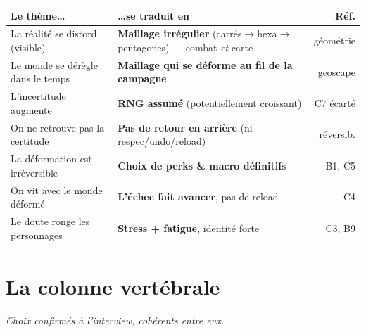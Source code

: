 \documentclass[11pt,a4paper]{article}
\begin{document}
\smallskip
\renewcommand{\arraystretch}{1.25}
\begin{tabularx}{\linewidth}{@{}X X r@{}}
\toprule
\textbf{Le thème\dots} & \textbf{\dots se traduit en} & \textbf{Réf.} \\
\midrule
La réalité se distord (visible) & \textbf{Maillage irrégulier} (carrés$\to$hexa$\to$pentagones) --- combat \emph{et} carte & géométrie \\
Le monde se dérègle dans le temps & \textbf{Maillage qui se déforme au fil de la campagne} & geoscape \\
L'incertitude augmente & \textbf{RNG assumé} (potentiellement croissant) & C7 écarté \\
On ne retrouve pas la certitude & \textbf{Pas de retour en arrière} (ni respec/undo/reload) & réversib. \\
La déformation est irréversible & \textbf{Choix de perks \& macro définitifs} & B1, C5 \\
On vit avec le monde déformé & \textbf{L'échec fait avancer}, pas de reload & C4 \\
Le doute ronge les personnages & \textbf{Stress + fatigue}, identité forte & C3, B9 \\
\bottomrule
\end{tabularx}
\renewcommand{\arraystretch}{1}

\section{La colonne vertébrale}
\emph{Choix confirmés à l'interview, cohérents entre eux.}
\end{document}
